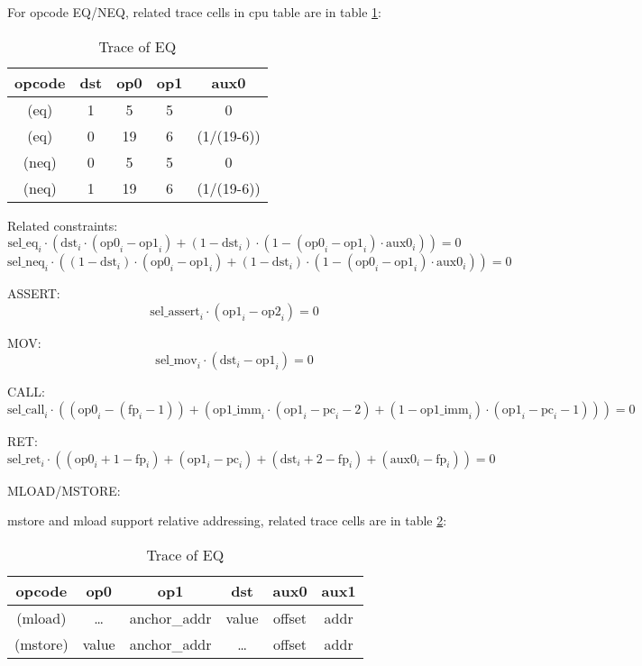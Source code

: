 For opcode EQ/NEQ, related trace cells in cpu table are in table \ref{table:constraint-eq}:
\begin{table}[!ht]
    \centering
    \begin{tabular}{|c|c|c|c|c|}
        \hline
        \rowcolor{gray} opcode & dst & op0 & op1 & aux0       \\
        \hline
        (eq)                   & 1   & 5   & 5   & 0          \\
        \hline
        (eq)                   & 0   & 19  & 6   & (1/(19-6)) \\
        \hline
        (neq)                  & 0   & 5   & 5   & 0          \\
        \hline
        (neq)                  & 1   & 19  & 6   & (1/(19-6)) \\
        \hline
    \end{tabular}
    \caption{Trace of EQ}
    \label{table:constraint-eq}
\end{table}

Related constraints:
\[ \mathrm{sel\_eq}_i \cdot (\mathrm{dst}_i \cdot (\mathrm{op0}_i - \mathrm{op1}_i) + (1 - \mathrm{dst}_i) \cdot (1 - (\mathrm{op0}_i - \mathrm{op1}_i) \cdot \mathrm{aux0}_i)) = 0 \]
\[ \mathrm{sel\_neq}_i \cdot ((1 - \mathrm{dst}_i) \cdot (\mathrm{op0}_i - \mathrm{op1}_i) + (1 - \mathrm{dst}_i) \cdot (1 - (\mathrm{op0}_i - \mathrm{op1}_i) \cdot \mathrm{aux0}_i)) = 0 \]

ASSERT:
\[ \mathrm{sel\_assert}_i \cdot (\mathrm{op1}_i - \mathrm{op2}_i) = 0 \]

MOV:
\[ \mathrm{sel\_mov}_i \cdot (\mathrm{dst}_i - \mathrm{op1}_i) = 0 \]

CALL:
\[ \mathrm{sel\_call}_i \cdot ((\mathrm{op0}_i - (\mathrm{fp}_i - 1))+(\mathrm{op1\_imm}_i \cdot (\mathrm{op1}_i - \mathrm{pc}_i - 2) + (1 - \mathrm{op1\_imm}_i) \cdot (\mathrm{op1}_i - \mathrm{pc}_i - 1)))=0 \]

RET:
\[ \mathrm{sel\_ret}_i \cdot ((\mathrm{op0}_i + 1 - \mathrm{fp}_i) + (\mathrm{op1}_i - \mathrm{pc}_i) + (\mathrm{dst}_i + 2 - \mathrm{fp}_i) + (\mathrm{aux0}_i - \mathrm{fp}_i))=0 \]

MLOAD/MSTORE:

mstore and mload support relative addressing, related trace cells are in table \ref{table:constraint-mstore-mload}:
\begin{table}[!ht]
    \centering
    \begin{tabular}{|c|c|c|c|c|c|}
        \hline
        \rowcolor{gray} opcode & op0   & op1          & dst   & aux0   & aux1 \\
        \hline
        (mload)                & \dots & anchor\_addr & value & offset & addr \\
        \hline
        (mstore)               & value & anchor\_addr & \dots & offset & addr \\
        \hline
    \end{tabular}
    \caption{Trace of EQ}
    \label{table:constraint-mstore-mload}
\end{table}

